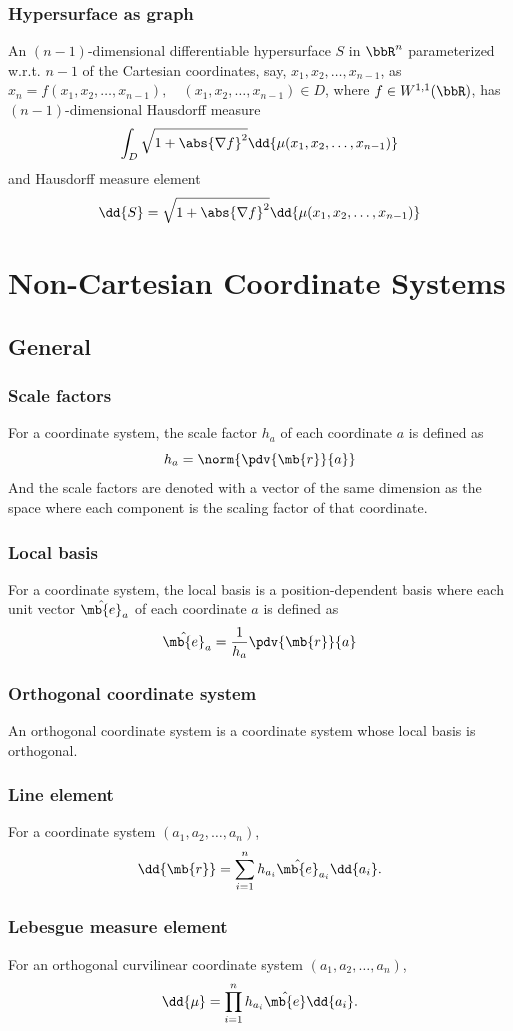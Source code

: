 \documentclass[a4paper,12pt]{report}
\begin{document}
\begin{itemize}
\begin{itemize}
\subsubsection{Hypersurface as graph}
An $(n-1)$-dimensional differentiable hypersurface $S$ in $\bbR^n$ parameterized w.r.t. $n-1$ of the Cartesian coordinates, say, $x_1,x_2,\ldots,x_{n-1}$, as $x_n=f(x_1,x_2,\ldots,x_{n-1}),\quad (x_1,x_2,\ldots,x_{n-1})\in D$, where $f\in W^{1,1}(\bbR)$, has $(n-1)$-dimensional Hausdorff measure
\[\int_D\sqrt{1+\abs{\nabla f}^2}\dd{\mu(x_1,x_2,\ldots,x_{n-1})}\]
and Hausdorff measure element
\[\dd{S}=\sqrt{1+\abs{\nabla f}^2}\dd{\mu(x_1,x_2,\ldots,x_{n-1})}\]



\section{Non-Cartesian Coordinate Systems}
\subsection{General}
\subsubsection{Scale factors}
For a coordinate system, the scale factor $h_a$ of each coordinate $a$ is defined as
\[h_a=\norm{\pdv{\mb{r}}{a}}\]
And the scale factors are denoted with a vector of the same dimension as the space where each component is the scaling factor of that coordinate.
\subsubsection{Local basis}
For a coordinate system, the local basis is a position-dependent basis where each unit vector $\hat{\mb{e}}_a$ of each coordinate $a$ is defined as
\[\hat{\mb{e}}_a=\frac{1}{h_a}\pdv{\mb{r}}{a}\]
\subsubsection{Orthogonal coordinate system}
An orthogonal coordinate system is a coordinate system whose local basis is orthogonal.
\subsubsection{Line element}
For a coordinate system $(a_1,a_2,\ldots,a_n)$,
\[\dd{\mb{r}}=\sum_{i=1}^nh_{a_i}\hat{\mb{e}}_{a_i}\dd{a_i}.\]
\subsubsection{Lebesgue measure element}
For an orthogonal curvilinear coordinate system $(a_1,a_2,\ldots,a_n)$,
\[\dd{\mu}=\prod_{i=1}^nh_{a_i}\hat{\mb{e}}\dd{a_i}.\]

\end{itemize}
\end{itemize}
\end{document}
